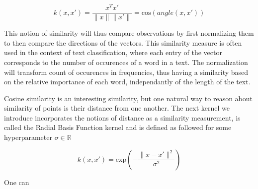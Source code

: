 \begin{equation*}
  k\left(x, x'\right) = \frac{x^Tx'}{\|x\|\|x'\|} = \text{cos}\left(angle\left(x, x'\right)\right)
\end{equation*}

This notion of similarity will thus compare observations by first normalizing them to then compare the directions of the vectors. This similarity measure is often used in the context of text classification, where each entry of the vector corresponds to the number of occurences of a word in a text. The normalization will transform count of occurences in frequencies, thus having a similarity based on the relative importance of each word, independantly of the length of the text.

Cosine similarity is an interesting similarity, but one natural way to reason about similarity of points is their distance from one another. The next kernel we introduce incorporates the notions of distance as a similarity measurement, is called the Radial Basis Function kernel and is defined as followed for some hyperparameter $\sigma \in \mathbb{R}$

\begin{equation*}
  k\left(x, x'\right) = \text{exp}\left(-\frac{\|x - x'\|^2}{\sigma^2}\right)
\end{equation*}

One can 





